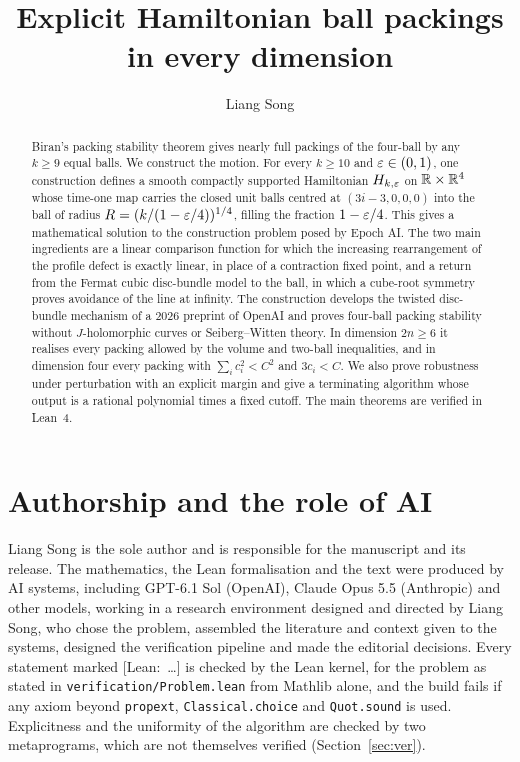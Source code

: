 \documentclass[11pt]{amsart}
\title[Explicit Hamiltonian ball packings]{Explicit Hamiltonian ball packings in every dimension}
\author{Liang Song}
\date{}
\begin{document}
\begin{abstract}
Biran's packing stability theorem gives nearly full packings of the four-ball by any $k\ge9$ equal balls. We
construct the motion. For every $k\ge10$ and $\varepsilon\in(0,1)$, one construction defines a smooth compactly
supported Hamiltonian $H_{k,\varepsilon}$ on $\mathbb{R}\times\mathbb{R}^4$ whose time-one map carries the closed unit balls centred at
$(3i-3,0,0,0)$ into the ball of radius $R=(k/(1-\varepsilon/4))^{1/4}$, filling the fraction $1-\varepsilon/4$. This gives a
mathematical solution to the construction problem posed by Epoch AI. The two main ingredients are a linear
comparison function for which the increasing rearrangement of the profile defect is exactly linear, in place of a
contraction fixed point, and a return from the Fermat cubic disc-bundle model to the ball, in which a cube-root symmetry proves
avoidance of the line at infinity. The construction develops the twisted disc-bundle mechanism of a 2026 preprint
of OpenAI and proves four-ball packing stability without $J$-holomorphic curves or Seiberg--Witten theory. In
dimension $2n\ge6$ it realises every packing allowed by the volume and two-ball inequalities, and in dimension
four every packing with $\sum_i c_i^2<C^2$ and $3c_i<C$. We also prove robustness under perturbation with an explicit
margin and give a terminating algorithm whose output is a rational polynomial times a fixed cutoff. The main theorems are
verified in Lean~4.
\end{abstract}
\maketitle










\section*{Authorship and the role of AI}

Liang Song is the sole author and is responsible for the manuscript and its release. The mathematics, the Lean
formalisation and the text were produced by AI systems, including GPT-6.1 Sol (OpenAI), Claude Opus 5.5
(Anthropic) and other models, working in a research environment designed and directed by Liang Song, who chose the
problem, assembled the literature and context given to the systems, designed the verification pipeline and made
the editorial decisions. Every statement marked [Lean:~\dots] is checked by the Lean kernel, for the problem as stated
in \texttt{verification/Problem.lean} from Mathlib alone, and the build fails if any axiom beyond \texttt{propext},
\texttt{Classical.choice} and \texttt{Quot.sound} is used. Explicitness and the uniformity of the algorithm are
checked by two metaprograms, which are not themselves verified (Section~\ref{sec:ver}).



\end{document}

